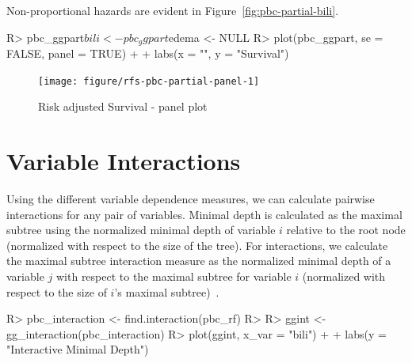 \documentclass[nojss]{jss}\usepackage[]{graphicx}\usepackage[]{color}
\begin{document}
Non-proportional hazards are evident in Figure~\ref{fig:pbc-partial-bili}.

\begin{Schunk}
\begin{Sinput}
R> pbc_ggpart$bili <- pbc_ggpart$edema <- NULL
R> plot(pbc_ggpart, se = FALSE, panel = TRUE) + 
+   labs(x = "", y = "Survival")
\end{Sinput}
\begin{figure}[!htpb]

{\centering \texttt{[image: figure/rfs-pbc-partial-panel-1]} 

}

\caption[Risk adjusted Survival - panel plot]{Risk adjusted Survival - panel plot\label{fig:pbc-partial-panel}}
\end{figure}
\end{Schunk}


\section{Variable Interactions}\label{S:interactions}
Using the different variable dependence measures, we can calculate pairwise interactions for any pair of variables. Minimal depth is calculated as the maximal subtree using the normalized minimal depth of variable $i$ relative to the root node (normalized with respect to the size of the tree). For interactions, we calculate the maximal subtree interaction measure as the normalized minimal depth of a variable $j$ with respect to the maximal subtree for variable $i$ (normalized with respect to the size of $i$'s maximal subtree)~\citep{Ishwaran_HighDimension:2010,Ishwaran_HighDimension:2011}.

\begin{Schunk}
\begin{Sinput}
R> pbc_interaction <- find.interaction(pbc_rf)
R> 
R> ggint <- gg_interaction(pbc_interaction)
R> plot(ggint, x_var = "bili") + 
+   labs(y = "Interactive Minimal Depth")
\end{Sinput}
\end{Schunk}
\end{document}
